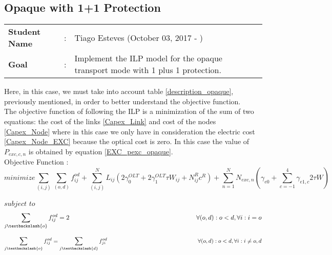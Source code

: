 \clearpage

\subsection{Opaque with 1+1 Protection}\label{ILP_Opaque_Protection}
\begin{tcolorbox}	
\begin{tabular}{p{2.75cm} p{0.2cm} p{10.5cm}} 	
\textbf{Student Name}  &:& Tiago Esteves    (October 03, 2017 - )\\
\textbf{Goal}          &:& Implement the ILP model for the opaque transport mode with 1 plus 1 protection.
\end{tabular}
\end{tcolorbox}
\vspace{11pt}

Here, in this case, we must take into account table \ref{description_opaque}, previously mentioned, in order to better understand the objective function.\\

The objective function of following the ILP is a minimization of the sum of two equations: the cost of the links \ref{Capex_Link} and cost of the nodes \ref{Capex_Node} where in this case we only have in consideration the electric cost \ref{Capex_Node_EXC} because the optical cost is zero.
In this case the value of $P_{exc,c,n}$ is obtained by equation \ref{EXC_pexc_opaque}.\\


Objective Function :\\
\begin{equation}
minimize \sum_{(i,j)} \sum_{(o,d)} f_{ij}^{od} + \sum_{(i,j)}^N L_{ij} ( 2 \gamma_0^{OLT} + 2 \gamma_1^{OLT} \tau W_{ij} + N^R_{ij} c^R ) + \sum_{n=1}^{N} N_{exc,n} ( \gamma_{e0} + \sum_{c=-1}^4 \gamma_{e1,c} 2 \tau W )
\label{ILPOpaque}
\end{equation}

$subject$ $to$
\begin{equation}
\sum_{j\textbackslash \{o\}} f_{ij}^{od} = 2  \qquad \qquad \qquad \qquad \qquad \qquad \qquad \qquad \qquad \qquad
\forall(o,d) : o < d, \forall i: i = o
\label{ILPOpaque1}
\end{equation}

\begin{equation}
\sum_{j\textbackslash \{o\}} f_{ij}^{od} = \sum_{j\textbackslash \{d\}} f_{ji}^{od}   \qquad \qquad \qquad \qquad \qquad \qquad \qquad \qquad
\forall(o,d) : o < d, \forall i: i \neq o,d
\label{ILPOpaque2}
\end{equation}

